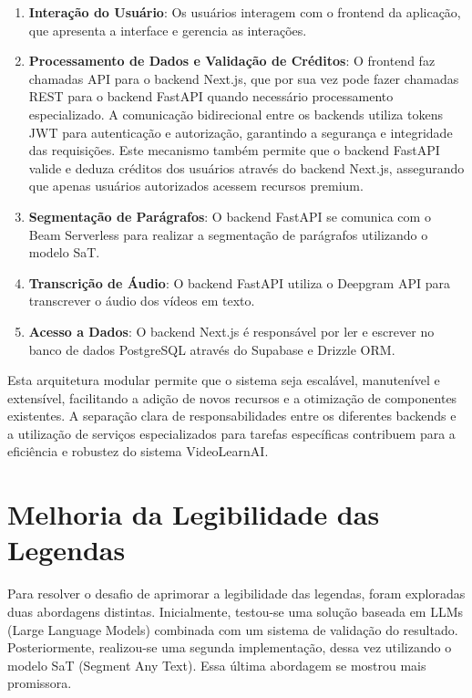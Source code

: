 \documentclass[tcc,capa]{texufpel}
\begin{document}
\begin{enumerate}
    \item \textbf{Interação do Usuário}: Os usuários interagem com o frontend da aplicação, que apresenta a interface e gerencia as interações.
    
    \item \textbf{Processamento de Dados e Validação de Créditos}: O frontend faz chamadas API para o backend Next.js, que por sua vez pode fazer chamadas REST para o backend FastAPI quando necessário processamento especializado. A comunicação bidirecional entre os backends utiliza tokens JWT para autenticação e autorização, garantindo a segurança e integridade das requisições. Este mecanismo também permite que o backend FastAPI valide e deduza créditos dos usuários através do backend Next.js, assegurando que apenas usuários autorizados acessem recursos premium.
    
    \item \textbf{Segmentação de Parágrafos}: O backend FastAPI se comunica com o Beam Serverless para realizar a segmentação de parágrafos utilizando o modelo SaT.
    
    \item \textbf{Transcrição de Áudio}: O backend FastAPI utiliza o Deepgram API para transcrever o áudio dos vídeos em texto.
    
    \item \textbf{Acesso a Dados}: O backend Next.js é responsável por ler e escrever no banco de dados PostgreSQL através do Supabase e Drizzle ORM.
\end{enumerate}

Esta arquitetura modular permite que o sistema seja escalável, manutenível e extensível, facilitando a adição de novos recursos e a otimização de componentes existentes. A separação clara de responsabilidades entre os diferentes backends e a utilização de serviços especializados para tarefas específicas contribuem para a eficiência e robustez do sistema VideoLearnAI.

\section{Melhoria da Legibilidade das Legendas}

Para resolver o desafio de aprimorar a legibilidade das legendas, foram exploradas duas abordagens distintas. Inicialmente, testou-se uma solução baseada em LLMs (Large Language Models) combinada com um sistema de validação do resultado. Posteriormente, realizou-se uma segunda implementação, dessa vez utilizando o modelo SaT (Segment Any Text). Essa última abordagem se mostrou mais promissora.
\end{document}
